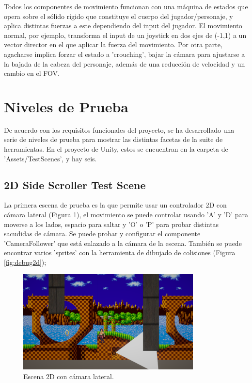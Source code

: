 Todos los componentes de movimiento funcionan con una máquina de estados que opera sobre el sólido rígido que constituye el cuerpo del jugador/personaje, y aplica distintas 
fuerzas a este dependiendo del input del jugador. El movimiento normal, por ejemplo, transforma el input de un joystick en dos ejes de (-1,1) a un vector director en el que 
aplicar la fuerza del movimiento. Por otra parte, agacharse implica forzar el estado a 'crouching', bajar la cámara para ajustarse a la bajada de la cabeza del personaje, además de una reducción de velocidad y
un cambio en el FOV.

\section{Niveles de Prueba}
De acuerdo con los requisitos funcionales del proyecto, se ha desarrollado una serie de niveles de prueba para mostrar las distintas facetas de la suite de herramientas. En el proyecto de Unity, estos se encuentran
en la carpeta de 'Assets/TestScenes', y hay seis.

\subsection{2D Side Scroller Test Scene}
La primera escena de prueba es la que permite usar un controlador 2D con cámara lateral (Figura \ref{fig:2dSideScroller}), el movimiento se puede controlar usando 'A' y 'D' para moverse a 
los lados, espacio para saltar y 'O' o 'P' para probar distintas sacudidas de cámara. Se puede probar y configurar el componente 'CameraFollower' que está 
enlazado a la cámara de la escena. También se puede encontrar varios 'sprites' con la herramienta de dibujado de colisiones (Figura \ref{fig:debug2d});

\begin{figure}[H]
   \centering
     \includegraphics[width=350px,clip=true]{2dSideScrollerTestScene.png}
   \caption{Escena 2D con cámara lateral.}
   \label{fig:2dSideScroller}
\end{figure}

